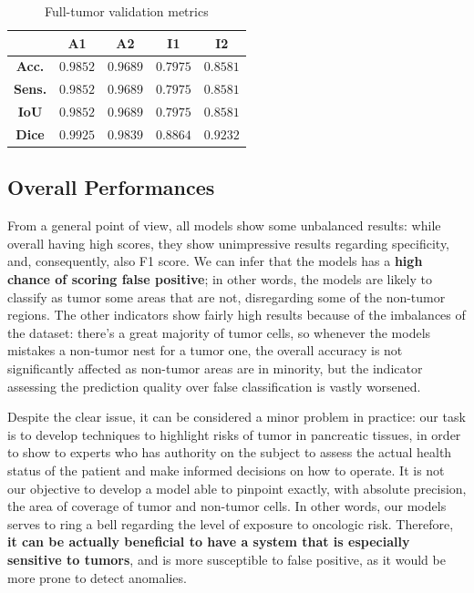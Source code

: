 \begin{table}[H]
\centering
\begin{tabular}{|c|c|c|c|c|}
\hline
& \textbf{A1} & \textbf{A2} & \textbf{I1} & \textbf{I2}
\\ \hline \hline
\textbf{Acc.} & \textcolor{mygreen}{$0.9852$} & $0.9689$ & \textcolor{myred}{$0.7975$} & $0.8581$
\\ \hline
\textbf{Sens.} & \textcolor{mygreen}{$0.9852$} & $0.9689$ & \textcolor{myred}{$0.7975$} & $0.8581$
\\ \hline
\textbf{IoU} & \textcolor{mygreen}{$0.9852$} & $0.9689$ & \textcolor{myred}{$0.7975$} & $0.8581$
\\ \hline
\textbf{Dice} & \textcolor{mygreen}{$0.9925$} & $0.9839$ & \textcolor{myred}{$0.8864$} & $0.9232$
\\ \hline
\end{tabular}
\caption{Full-tumor validation metrics}
\end{table}

\subsection{Overall Performances}

\par
From a general point of view, all models show some unbalanced results: while overall having high scores, they show unimpressive results regarding specificity, and, consequently, also F1 score. We can infer that the models has a \textbf{high chance of scoring false positive}; in other words, the models are likely to classify as tumor some areas that are not, disregarding some of the non-tumor regions. The other indicators show fairly high results because of the imbalances of the dataset: there's a great majority of tumor cells, so whenever the models mistakes a non-tumor nest for a tumor one, the overall accuracy is not significantly affected as non-tumor areas are in minority, but the indicator assessing the prediction quality over false classification is vastly worsened. 

\par
Despite the clear issue, it can be considered a minor problem in practice: our task is to develop techniques to highlight risks of tumor in pancreatic tissues, in order to show to experts who has authority on the subject to assess the actual health status of the patient and make informed decisions on how to operate. It is not our objective to develop a model able to pinpoint exactly, with absolute precision, the area of coverage of tumor and non-tumor cells. In other words, our models serves to ring a bell regarding the level of exposure to oncologic risk. Therefore, \textbf{it can be actually beneficial to have a system that is especially sensitive to tumors}, and is more susceptible to false positive, as it would be more prone to detect anomalies.

